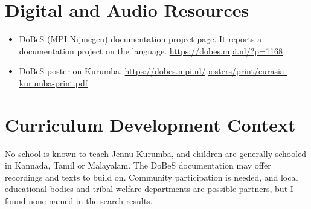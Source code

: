 \documentclass[12pt]{article}
\begin{document}
\section{Digital and Audio Resources}
\begin{itemize}
\item DoBeS (MPI Nijmegen) documentation project page. It reports a documentation project on the language. \url{https://dobes.mpi.nl/?p=1168}
\item DoBeS poster on Kurumba. \url{https://dobes.mpi.nl/posters/print/eurasia-kurumba-print.pdf}
\end{itemize}

\section{Curriculum Development Context}
No school is known to teach Jennu Kurumba, and children are generally schooled in Kannada, Tamil or Malayalam. The DoBeS documentation may offer recordings and texts to build on. Community participation is needed, and local educational bodies and tribal welfare departments are possible partners, but I found none named in the search results.
\end{document}
